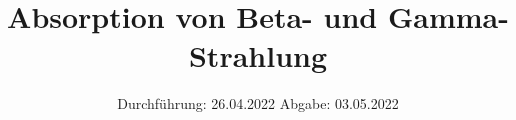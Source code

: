 

\subject{VERSUCH 704}
\title{Absorption von Beta- und Gamma-Strahlung}
\date{%
  Durchführung: 26.04.2022
  \hspace{3em}
  Abgabe: 03.05.2022
}



\maketitle
\thispagestyle{empty}
\tableofcontents
\newpage



%




\printbibliography{}


